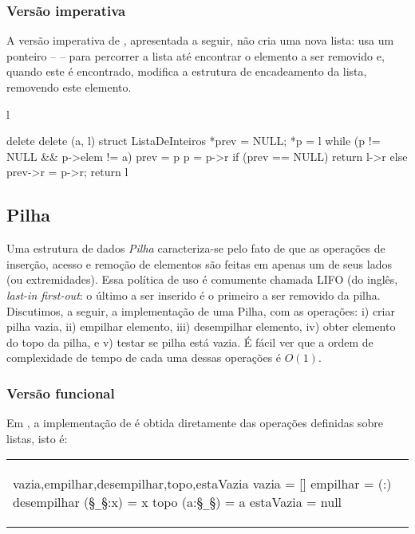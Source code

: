 \subsubsection{Versão imperativa}

A versão imperativa de , apresentada a seguir, não cria
uma nova lista: usa um ponteiro --  -- para percorrer a
lista até encontrar o elemento a ser removido e, quando este é
encontrado, modifica a estrutura de encadeamento da lista, removendo
este elemento.

\begin{center}
\begin{tabular}{l}
\begin{alg}{delete}{\decremento}
delete (a, l) 
   struct ListaDeInteiros *prev = NULL;  
   *p = l
   while (p != NULL && p->elem != a)
      prev = p
      p = p->r
      if (prev == NULL) 
         return l->r
      else { prev->r = p->r; return l }
\end{alg}
\end{tabular}
\end{center}
             
\subsection{Pilha}
\label{sec:pilha}

Uma estrutura de dados {\em Pilha} caracteriza-se pelo fato de que as
operações de inserção, acesso e remoção de elementos são feitas em
apenas um de seus lados (ou extremidades). Essa política de uso é
comumente chamada LIFO (do inglês, {\em last-in first-out\/}: o último
a ser inserido é o primeiro a ser removido da pilha. Discutimos, a
seguir, a implementação de uma Pilha, com as operações: i) criar pilha
vazia, ii) empilhar elemento, iii) desempilhar elemento, iv) obter
elemento do topo da pilha, e v) testar se pilha está vazia. É fácil
ver que a ordem de complexidade de tempo de cada uma dessas operações
é $O(1)$.

\subsubsection{Versão funcional}
\label{sec:ops-sobre-pilhas-versao-func}

Em \Haskell, a implementação de  é obtida diretamente das operações definidas sobre listas, isto é:

\begin{center}
\begin{tabular}{l}
\begin{hask}{vazia,empilhar,desempilhar,topo,estaVazia}{}
vazia = []
empilhar = (:)
desempilhar (§{\tt \_}§:x) = x
topo (a:§{\tt \_}§) = a
estaVazia = null
\end{hask}
\end{tabular}
\end{center}
                  
